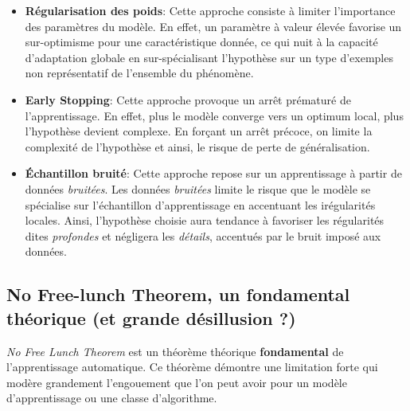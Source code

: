 \begin{itemize}
    \item \textbf{Régularisation des poids}: Cette approche consiste à limiter l'importance des paramètres du modèle. En effet, un paramètre à valeur élevée favorise un sur-optimisme pour une caractéristique donnée, ce qui nuit à la capacité d'adaptation globale en sur-spécialisant l'hypothèse sur un type d'exemples non représentatif de l'ensemble du phénomène.\\

    \item \textbf{Early Stopping}: Cette approche provoque un arrêt prématuré de l'apprentissage. En effet, plus le modèle converge vers un optimum local, plus l'hypothèse devient complexe. En forçant un arrêt précoce, on limite la complexité de l'hypothèse et ainsi, le risque de perte de généralisation.\\

    \item \textbf{Échantillon bruité}: Cette approche repose sur un apprentissage à partir de données \textit{bruitées}. Les données \textit{bruitées} limite le risque que le modèle se spécialise sur l'échantillon d'apprentissage en accentuant les irégularités locales. Ainsi, l'hypothèse choisie aura tendance à favoriser les régularités dites \textit{profondes} et négligera les \textit{détails}, accentués par le bruit imposé aux données.
\end{itemize}

\subsection{No Free-lunch Theorem, un fondamental théorique (et grande désillusion ?)}

\noindent \textit{No Free Lunch Theorem}\cite{nflt} est un théorème théorique \textbf{fondamental} de l'apprentissage automatique. Ce théorème démontre une limitation forte qui modère grandement l'engouement que l'on peut avoir pour un modèle d'apprentissage ou une classe d'algorithme.\\


